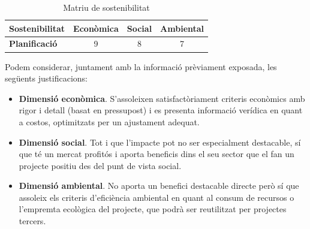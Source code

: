 \begin{table}[htb]
\centering
\label{MatriuSostenibilitat}
\begin{tabular}{lccc}
\hline \textbf{Sostenibilitat}                           &  \textbf{Econòmica} & \textbf{Social}                           &  \textbf{Ambiental} \\
\hline
\textbf{Planificació} & 9 & 8 & 7 \\
\hline            
\end{tabular}%
\caption{Matriu de sostenibilitat}
\end{table}

Podem considerar, juntament amb la informació prèviament exposada, les següents justificacions:

\begin{itemize}
\item \textbf{Dimensió econòmica}. S’assoleixen satisfactòriament criteris econòmics amb rigor i detall (basat en pressupost) i es presenta informació verídica en quant a costos, optimitzats per un ajustament adequat.
\item \textbf{Dimensió social}. Tot i que l’impacte pot no ser especialment destacable, sí que té un mercat profitós i aporta beneficis dins el seu sector que el fan un projecte positiu des del punt de vista social.
\item \textbf{Dimensió ambiental}. No aporta un benefici destacable directe però sí que assoleix els criteris d’eficiència ambiental en quant al consum de recursos o l’empremta ecològica del projecte, que podrà ser reutilitzat per projectes tercers.
\end{itemize}